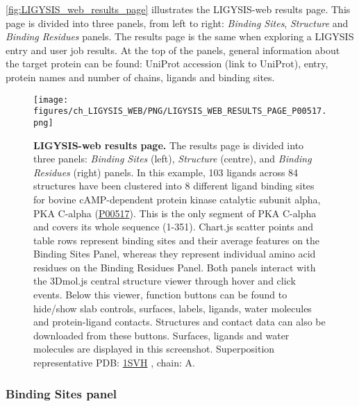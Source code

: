 \autoref{fig:LIGYSIS_web_results_page} illustrates the LIGYSIS-web results page. This page is divided into three panels, from left to right: \textit{Binding Sites}, \textit{Structure} and \textit{Binding Residues} panels. The results page is the same when exploring a LIGYSIS entry and user job results. At the top of the panels, general information about the target protein can be found: UniProt accession (link to UniProt), entry, protein names and number of chains, ligands and binding sites.

\begin{figure}[htb!]
    \centering
    \texttt{[image: figures/ch\_LIGYSIS\_WEB/PNG/LIGYSIS\_WEB\_RESULTS\_PAGE\_P00517.png]}
    \caption[LIGYSIS-web results page]{\textbf{LIGYSIS-web results page.} The results page is divided into three panels: \textit{Binding Sites} (left), \textit{Structure} (centre), and \textit{Binding Residues} (right) panels. In this example, 103 ligands across 84 structures have been clustered into 8 different ligand binding sites for bovine cAMP-dependent protein kinase catalytic subunit alpha, PKA C-alpha (\href{https://www.uniprot.org/uniprotkb/P00517/entry}{P00517}). This is the only segment of PKA C-alpha and covers its whole sequence (1-351). Chart.js scatter points and table rows represent binding sites and their average features on the Binding Sites Panel, whereas they represent individual amino acid residues on the Binding Residues Panel. Both panels interact with the 3Dmol.js central structure viewer through hover and click events. Below this viewer, function buttons can be found to hide/show slab controls, surfaces, labels, ligands, water molecules and protein-ligand contacts. Structures and contact data can also be downloaded from these buttons. Surfaces, ligands and water molecules are displayed in this screenshot. Superposition representative PDB: \href{https://www.ebi.ac.uk/pdbe/entry/pdb/1svh}{1SVH} \cite{BREITENLECHNER_2004_PKB}, chain: A.}
    \label{fig:LIGYSIS_web_results_page}
\end{figure}

\subsubsection{Binding Sites panel}

